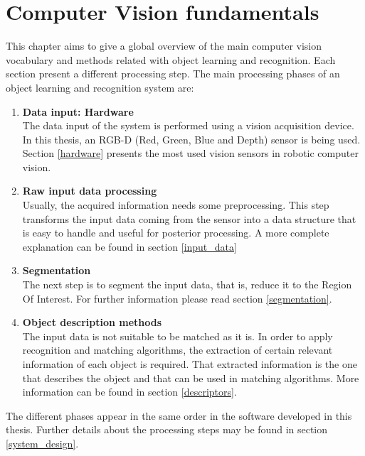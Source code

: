 \chapter{Computer Vision fundamentals}
\label{fundamentals}
This chapter aims to give a global overview of the main computer vision vocabulary and methods related with object learning and recognition. 
Each section present a different processing step. 
The main processing phases of an object learning and recognition system are: 
\begin {enumerate}
	\item{\textbf{Data input: Hardware} \\}
	The data input of the system is performed using a vision acquisition device. 
	In this thesis, an RGB-D (Red, Green, Blue and Depth) sensor is being used. 
	Section \ref{hardware} presents the most used vision sensors in robotic computer vision. 

	\item{\textbf{Raw input data processing}\\}
	Usually, the acquired information needs some preprocessing. 
	This step transforms the input data coming from the sensor into a data structure that is easy to handle and useful for posterior processing.
	A more complete explanation can be found in section \ref{input_data}

	\item{\textbf{Segmentation}\\}
	The next step is to segment the input data, that is, reduce it to the Region Of Interest. 
	For further information please read section \ref{segmentation}.

	\item{\textbf{Object description methods}\\}
	The input data is not suitable to be matched as it is. 
	In order to apply recognition and matching algorithms, the extraction of certain relevant information of each object is required. 
	That extracted information is the one that describes the object and that can be used in matching algorithms. %
	More information can be found in section \ref{descriptors}.
\end{enumerate}

The different phases appear in the same order in the software developed in this thesis. 
Further details about the processing steps may be found in section \ref{system_design}.

